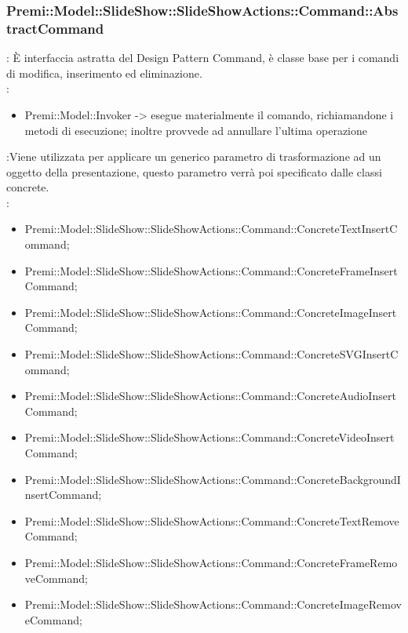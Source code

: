 {	\subsubsection{Premi::Model::SlideShow::SlideShowActions::Command::AbstractCommand}{
				\textbf{\tipo}: È interfaccia astratta del Design Pattern Command, è classe base per i comandi di modifica, inserimento ed eliminazione.\\	
				\textbf{\relaz}: 
				\begin{itemize}
                    \item Premi::Model::Invoker -> esegue materialmente il comando, richiamandone i metodi di esecuzione; inoltre provvede ad annullare l’ultima operazione 
				\end{itemize}	
                \textbf{\interfacce}:Viene utilizzata per applicare un generico parametro di trasformazione ad un oggetto della presentazione, questo parametro verrà poi specificato dalle classi concrete.\\
                \textbf{\figli}: 
                    \begin{itemize}
                    \item Premi::Model::SlideShow::SlideShowActions::Command::ConcreteTextInsertCommand;
                    \item Premi::Model::SlideShow::SlideShowActions::Command::ConcreteFrameInsertCommand;
                    \item Premi::Model::SlideShow::SlideShowActions::Command::ConcreteImageInsertCommand;
                    \item Premi::Model::SlideShow::SlideShowActions::Command::ConcreteSVGInsertCommand;
                    \item Premi::Model::SlideShow::SlideShowActions::Command::ConcreteAudioInsertCommand;
                    \item Premi::Model::SlideShow::SlideShowActions::Command::ConcreteVideoInsertCommand;
                    \item Premi::Model::SlideShow::SlideShowActions::Command::ConcreteBackgroundInsertCommand;
                    \item Premi::Model::SlideShow::SlideShowActions::Command::ConcreteTextRemoveCommand;
                    \item Premi::Model::SlideShow::SlideShowActions::Command::ConcreteFrameRemoveCommand;
                    \item Premi::Model::SlideShow::SlideShowActions::Command::ConcreteImageRemoveCommand;

\end{itemize}}}
